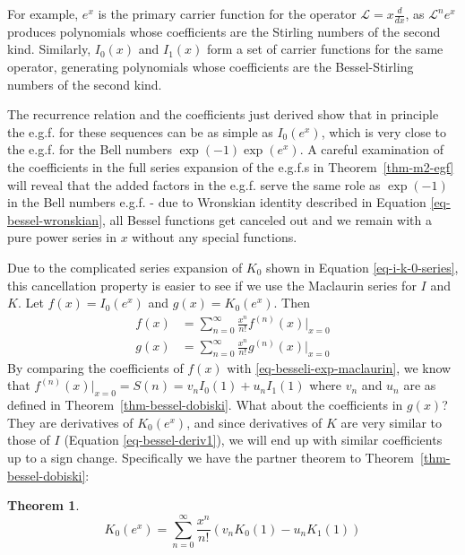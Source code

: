 \documentclass[a4paper]{amsart}
\newtheorem{theorem}{Theorem}
\begin{document}
For example, $e^x$ is the primary carrier function for the operator $\mathcal{L} = x\frac{d}{dx}$, as $\mathcal{L}^n e^x$ produces polynomials whose coefficients are the Stirling numbers of the second kind. Similarly, $I_0(x)$ and $I_1(x)$ form a set of carrier functions for the same operator, generating polynomials whose coefficients are the Bessel-Stirling numbers of the second kind.

The recurrence relation and the coefficients just derived show that in principle the e.g.f. for these sequences can be as simple as $I_0(e^x)$, which is very close to the e.g.f. for the Bell numbers $\exp(-1)\exp(e^x)$. A careful examination of the coefficients in the full series expansion of the e.g.f.s in Theorem~\ref{thm-m2-egf} will reveal that the added factors in the e.g.f. serve the same role as $\exp(-1)$ in the Bell numbers e.g.f. - due to Wronskian identity described in Equation \eqref{eq-bessel-wronskian}, all Bessel functions get canceled out and we remain with a pure power series in $x$ without any special functions. 

Due to the complicated series expansion of $K_0$ shown in Equation \eqref{eq-i-k-0-series}, this cancellation property is easier to see if we use the Maclaurin series for $I$ and $K$. Let $f(x) = I_0(e^x)$ and $g(x) = K_0(e^x)$. Then
\[
\begin{aligned}
f(x) &= \sum_{n=0}^\infty \frac{x^n}{n!} f^{(n)}(x)|_{x=0} \\
g(x) &= \sum_{n=0}^\infty \frac{x^n}{n!} g^{(n)}(x)|_{x=0}
\end{aligned}
\]
By comparing the coefficients of $f(x)$ with \eqref{eq-besseli-exp-maclaurin}, we know that $f^{(n)}(x)|_{x=0} = S(n) = v_n I_0(1)+u_nI_1(1)$ where $v_n$ and $u_n$ are as defined in Theorem~\ref{thm-bessel-dobiski}. What about the coefficients in $g(x)$? They are derivatives of $K_0(e^x)$, and since derivatives of $K$ are very similar to those of $I$ (Equation \ref{eq-bessel-deriv1}), we will end up with similar coefficients up to a sign change. Specifically we have the partner theorem to Theorem~\ref{thm-bessel-dobiski}:

\begin{theorem}\label{thm-besselk-dobinski}
\[
K_0(e^x) = \sum_{n=0}^\infty \frac{x^n}{n!}(v_n K_0(1) - u_n K_1(1))
\]
\end{theorem}
\end{document}
